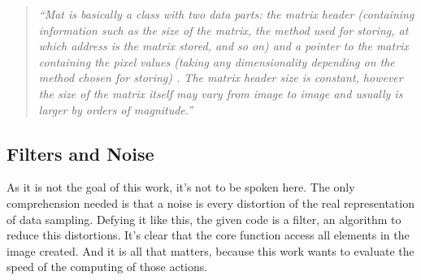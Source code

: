         \begin{quotation}
        
        \emph{
        ``Mat is basically a class with two data parts: the matrix header (containing information such as the size of the matrix, the method used for storing, at which address is the matrix stored, and so on) and a pointer to the matrix containing the pixel values (taking any dimensionality depending on the method chosen for storing) . The matrix header size is constant, however the size of the matrix itself may vary from image to image and usually is larger by orders of magnitude.''}   
        \end{quotation}

    \subsection{Filters and Noise}
        As it is not the goal of this work, it's not to be spoken here. The only comprehension needed is that a noise is every distortion of the real representation of data sampling. Defying it like this, the given code is a filter, an algorithm to reduce this distortions. It's clear that the core function access all elements in the image created. And it is all that matters, because this work wants to evaluate the speed of the computing of those actions.
